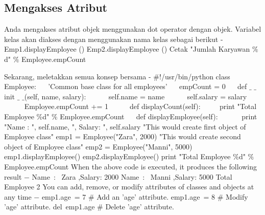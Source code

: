 {\subsection{Mengakses Atribut}
Anda mengakses atribut objek menggunakan dot operator dengan objek. Variabel kelas akan diakses dengan menggunakan nama kelas sebagai berikut - 
\vspace{12pt}
\noindent 
Emp1.displayEmployee () \noindent 
Emp2.displayEmployee ()
\noindent 
Cetak "Jumlah Karyawan $  \%  $ d" $  \%  $ Employee.empCount 
\vspace{12pt}
\noindent

Sekarang, meletakkan semua konsep bersama - 
\noindent 
 $  \#  $!/usr/bin/python 
\vspace{12pt}
\noindent 
class Employee: 
\noindent 
~~ 'Common base class for all employees' 
\noindent 
~~ empCount = 0 
\vspace{12pt}
\noindent 
~~ def  $  \_  $ $  \_  $init $  \_  $ $  \_  $(self, name, salary): 
\noindent 
~~~~~ self.name = name 
\noindent 
~~~~~ self.salary = salary 
\noindent 
~~~~~ Employee.empCount += 1 
\noindent 
~~  
\noindent 
~~ def displayCount(self): 
\noindent 
~~~~ print "Total Employee  $  \%  $d"  $  \%  $ Employee.empCount 
\vspace{12pt}
\noindent 
~~ def displayEmployee(self): 
\noindent 
~~~~~~print "Name : ", self.name,  ", Salary: ", self.salary 
\vspace{12pt}
\noindent 
"This would create first object of Employee class" 
\noindent 
emp1 = Employee("Zara", 2000) 
\noinden
"This would create second object of Employee class" 
\noindent 
emp2 = Employee("Manni", 5000) 
\noindent 
emp1.displayEmployee() 
\noindent 
emp2.displayEmployee() 
\noindent 
print "Total Employee  $  \%  $d"  $  \%  $ Employee.empCount 
\noindent 
When the above code is executed, it produces the following result  $ - $ 
\noindent 
Name~:~ Zara ,Salary:  2000 
\noindent 
Name~:~ Manni ,Salary:  5000 
\noindent 
Total Employee 2 
\noindent 
You can add, remove, or modify attributes of classes and objects at any time  $ - $ 
\noindent 
emp1.age~= 7   $  \#  $ Add an 'age' attribute. 
\noindent 
emp1.age~= 8   $  \#  $ Modify 'age' attribute. 
\noindent 
del~emp1.age   $  \#  $ Delete 'age' attribute. 
\vspace{12pt}

}
